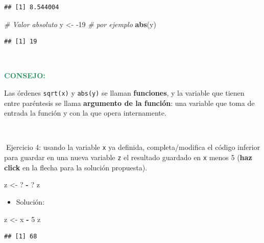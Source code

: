 \documentclass[11pt,]{book}
\newenvironment{Shaded}{\begin{snugshade}}{\end{snugshade}}
\newcommand{\CommentTok}[1]{\textcolor[rgb]{0.37,0.37,0.37}{\textit{#1}}}
\newcommand{\DecValTok}[1]{\textcolor[rgb]{0.06,0.06,0.06}{#1}}
\newcommand{\KeywordTok}[1]{\textcolor[rgb]{0.27,0.27,0.27}{\textbf{#1}}}
\newcommand{\NormalTok}[1]{#1}
\newcommand{\OperatorTok}[1]{\textcolor[rgb]{0.43,0.43,0.43}{\textbf{#1}}}
\newcommand{\StringTok}[1]{\textcolor[rgb]{0.5,0.5,0.5}{#1}}
\providecommand{\tightlist}{%
  \setlength{\itemsep}{0pt}\setlength{\parskip}{0pt}}
\begin{document}
\begin{verbatim}
## [1] 8.544004
\end{verbatim}

\begin{Shaded}
\begin{Highlighting}[]
\CommentTok{# Valor absoluto}
\NormalTok{y <-}\StringTok{ }\DecValTok{-19} \CommentTok{# por ejemplo}
\KeywordTok{abs}\NormalTok{(y)}
\end{Highlighting}
\end{Shaded}

\begin{verbatim}
## [1] 19
\end{verbatim}

~

\textbf{\textcolor{#20935E}{CONSEJO:}}

Las órdenes \texttt{sqrt(x)} y \texttt{abs(y)} se llaman \textbf{funciones}, y la variable que tienen entre paréntesis se llama \textbf{argumento de la función}: una variable que toma de entrada la función y con la que opera internamente.

~

📝Ejercicio 4: usando la variable \texttt{x} ya definida, completa/modifica el código inferior para guardar en una nueva variable \texttt{z} el resultado guardado en \texttt{x} menos 5 (\textbf{haz click} en la flecha para la solución propuesta).

\begin{Shaded}
\begin{Highlighting}[]
\NormalTok{z <-}\StringTok{ }\NormalTok{? }\OperatorTok{-}\StringTok{ }\NormalTok{?}
\NormalTok{z}
\end{Highlighting}
\end{Shaded}

\begin{itemize}
\tightlist
\item
  Solución:
\end{itemize}

\begin{Shaded}
\begin{Highlighting}[]
\NormalTok{z <-}\StringTok{ }\NormalTok{x }\OperatorTok{-}\StringTok{ }\DecValTok{5}
\NormalTok{z}
\end{Highlighting}
\end{Shaded}

\begin{verbatim}
## [1] 68
\end{verbatim}

~
\end{document}
